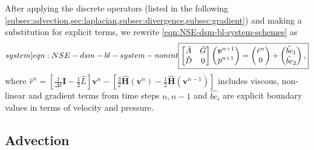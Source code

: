 \documentclass{article}
\numberwithin{equation}{section}
\begin{document}
After applying the discrete operators (listed in the following \cref{subsec:advection,sec:laplacian,subsec:divergence,subsec:gradient}) and making a substitution for explicit terms, we rewrite \cref{eqn:NSE-dsm-bl-system-schemes}  as
\begin{equation}\label[system]{eqn:NSE-dsm-bl-system-nonint}
	\boxed{\begin{bmatrix}
		\hat{A} & \hat{G} \\
		\hat{D} & 0
	\end{bmatrix}
	\begin{pmatrix}
		\boldsymbol{v}^{n+1} \\ 
		p^{n+1}
	\end{pmatrix}
	=
	\begin{pmatrix}
		\hat{r}^n \\
		0
	\end{pmatrix}
	+
	\begin{pmatrix}
		\hat{bc}_1\\
		\hat{bc}_2
	\end{pmatrix},}
\end{equation}
where $\hat{r}^n=\left[\frac{1}{\Delta t}\mathbf{I}-\frac{1}{2}\hat{L}\right] \boldsymbol{v}^n - \left[\frac{3}{2}\hat{\mathbf{H}}(\boldsymbol{v}^n) - \frac{1}{2}\hat{\mathbf{H}}(\boldsymbol{v}^{n-1})\right]$ includes viscous, non-linear and gradient terms from time steps $n,n-1$ and $\hat{bc}_i$ are explicit boundary values in terms of velocity and pressure.




\subsection{Advection}\label{subsec:advection}
\end{document}
